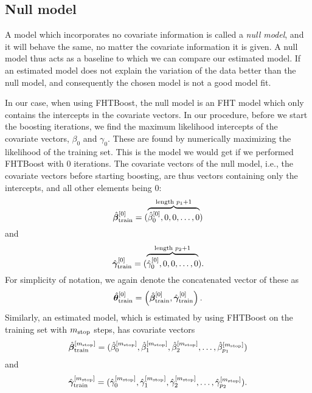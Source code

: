 \subsection{Null model}
A model which incorporates no covariate information is called a \textit{null model}, and it will behave the same, no matter the covariate information it is given.
A null model thus acts as a baseline to which we can compare our estimated model.
If an estimated model does not explain the variation of the data better than the null model, and consequently the chosen model is not a good model fit.

In our case, when using FHTBoost, the null model is an FHT model which only contains the intercepts in the covariate vectors.
In our procedure, before we start the boosting iterations, we find the maximum likelihood intercepts of the covariate vectors, $\beta_0$ and $\gamma_0$.
These are found by numerically maximizing the likelihood of the training set.
This is the model we would get if we performed FHTBoost with 0 iterations.
The covariate vectors of the null model, i.e., the covariate vectors before starting boosting, are thus vectors containing only the intercepts, and all other elements being 0:
\begin{equation*}
    \hat{\boldsymbol{\beta}}^{[0]}_{\text{train}}=(\overbrace{\hat{\beta}_0^{[0]},0,0,\ldots,0}^{\text{length }p_1+1})
\end{equation*}
and
\begin{equation*}
    \hat{\boldsymbol{\gamma}}^{[0]}_{\text{train}}=(\overbrace{\hat{\gamma}_0^{[0]},0,0,\ldots,0}^{\text{length }p_2+1}).
\end{equation*}
For simplicity of notation, we again denote the concatenated vector of these as
\begin{equation*}
    \hat{\boldsymbol{\theta}}^{[0]}_{\text{train}}=\left(\hat{\boldsymbol{\beta}}_{\text{train}}^{[0]},\hat{\boldsymbol{\gamma}}_{\text{train}}^{[0]}\right).
\end{equation*}
Similarly, an estimated model, which is estimated by using FHTBoost on the training set with $m_{\text{stop}}$ steps, has covariate vectors
\begin{equation*}
    \hat{\boldsymbol{\beta}}^{[m_{\text{stop}}]}_{\text{train}}=(\hat{\beta}_0^{[m_{\text{stop}}]},\hat{\beta}_1^{[m_{\text{stop}}]},\hat{\beta}_2^{[m_{\text{stop}}]},\ldots,\hat{\beta}_{p_1}^{[m_{\text{stop}}]})
\end{equation*}
and
\begin{equation*}
    \hat{\boldsymbol{\gamma}}^{[m_{\text{stop}}]}_{\text{train}}=(\hat{\gamma}_0^{[m_{\text{stop}}]},\hat{\gamma}_1^{[m_{\text{stop}}]},\hat{\gamma}_2^{[m_{\text{stop}}]},\ldots,\hat{\gamma}_{p_2}^{[m_{\text{stop}}]}).
\end{equation*}
